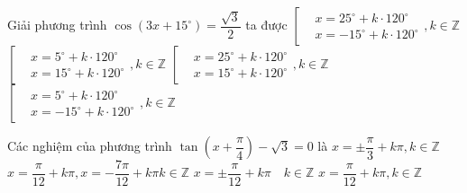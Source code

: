 \begin{ex}%
Giải phương trình $\cos \left( 3x+15^{\circ} \right)=\dfrac{\sqrt{3}}{2}$ ta được
	\choice
	{$\left[\begin{aligned}&x=25^{\circ}+k \cdot 120^{\circ} \\& x=-15^{\circ}+k \cdot 120^{\circ}\end{aligned}, k \in \mathbb{Z}\right.$}
	{$\left[\begin{aligned}&x=5^{\circ}+k \cdot 120^{\circ} \\ &x=15^{\circ}+k \cdot 120^{\circ}\end{aligned}, k \in \mathbb{Z} \right.$}
	{$\left[\begin{aligned}&x=25^{\circ}+k \cdot 120^{\circ} \\& x=15^{\circ}+k \cdot 120^{\circ}\end{aligned}, k \in \mathbb{Z}\right.$}
	{\True $\left[\begin{aligned}&x=5^{\circ}+k \cdot 120^{\circ} \\& x=-15^{\circ}+k \cdot 120^{\circ}\end{aligned}, k \in \mathbb{Z} \right.$}
\end{ex}
\begin{ex}%
	Các nghiệm của phương trình $\tan \left(x+\dfrac{\pi}{4}\right)-\sqrt{3}=0$ là
	\choice
	{$x= \pm \dfrac{\pi}{3}+k \pi, k \in \mathbb{Z}$}
	{\True $x=\dfrac{\pi}{12}+k \pi, x=-\dfrac{7 \pi}{12}+k \pi k \in \mathbb{Z}$}
	{$x= \pm \dfrac{\pi}{12}+k \pi \quad k \in \mathbb{Z}$}
	{$x=\dfrac{\pi}{12}+k \pi, k \in \mathbb{Z}$}
\end{ex}
